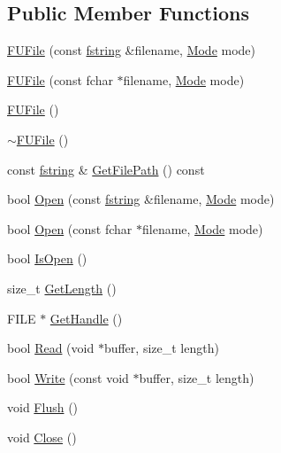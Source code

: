 \subsection*{Public Member Functions}
\begin{DoxyCompactItemize}
\item 
\hyperlink{classFUFile_ae38268fadff7494ef1d4de12f0449249}{FUFile} (const \hyperlink{classfm_1_1stringT}{fstring} \&filename, \hyperlink{classFUFile_a68a459ccb913df26fe3cf6b123522849}{Mode} mode)
\item 
\hyperlink{classFUFile_a18861f7e2a1811e713f6c158dc4ef448}{FUFile} (const fchar $\ast$filename, \hyperlink{classFUFile_a68a459ccb913df26fe3cf6b123522849}{Mode} mode)
\item 
\hyperlink{classFUFile_aea23daaa88aaeaa68ad91e899f9f44ba}{FUFile} ()
\item 
\hyperlink{classFUFile_a4bf33e86be4d1de4dcbb3f1ff076066c}{$\sim$FUFile} ()
\item 
const \hyperlink{classfm_1_1stringT}{fstring} \& \hyperlink{classFUFile_a281f5005c7a5f8c92af5ef634daf50cc}{GetFilePath} () const 
\item 
bool \hyperlink{classFUFile_a6897b0e76905c647a7d978fae708e0bb}{Open} (const \hyperlink{classfm_1_1stringT}{fstring} \&filename, \hyperlink{classFUFile_a68a459ccb913df26fe3cf6b123522849}{Mode} mode)
\item 
bool \hyperlink{classFUFile_a8747c052dfc0d9f7b6d724965ad106a3}{Open} (const fchar $\ast$filename, \hyperlink{classFUFile_a68a459ccb913df26fe3cf6b123522849}{Mode} mode)
\item 
bool \hyperlink{classFUFile_afe736bdc6e3ff9d3eb24fcab239a46dc}{IsOpen} ()
\item 
size\_\-t \hyperlink{classFUFile_af5d30f63d81e56c5fb5e25eccf764b5b}{GetLength} ()
\item 
FILE $\ast$ \hyperlink{classFUFile_afa1c4f220686af45a24071dd3c5b0c41}{GetHandle} ()
\item 
bool \hyperlink{classFUFile_a7758a60a2ccc8506bb4666e42f462e97}{Read} (void $\ast$buffer, size\_\-t length)
\item 
bool \hyperlink{classFUFile_a58f02e2b667e9b42c3bb89cc2450a66e}{Write} (const void $\ast$buffer, size\_\-t length)
\item 
void \hyperlink{classFUFile_a0c5a65257b3254c710c5dd6716db561c}{Flush} ()
\item 
void \hyperlink{classFUFile_a4ac9f391e99c0526d0a6d525540def3b}{Close} ()
\end{DoxyCompactItemize}


